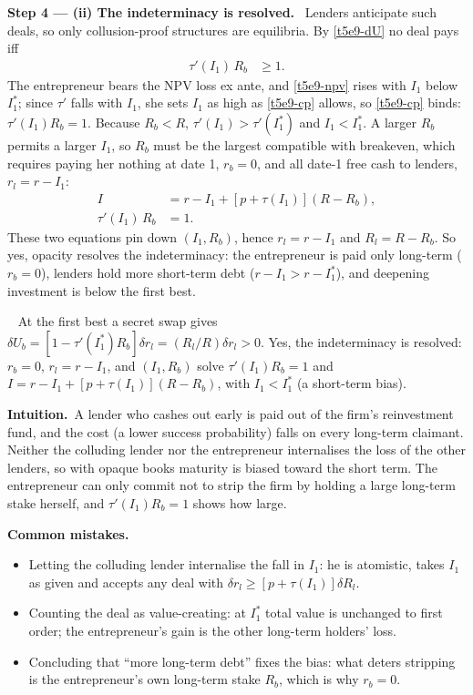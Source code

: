 \documentclass[11pt,a4paper]{article}
\newcommand{\step}[2]{\par\medskip\noindent\textbf{Step #1 --- #2.}~}
\newcommand{\intuition}{\par\medskip\noindent\textbf{Intuition.}~}
\newcommand{\answer}[1]{\par\smallskip\noindent\fbox{\textbf{Answer #1.}}~}
\newcommand{\pitfalls}{\par\medskip\noindent\textbf{Common mistakes.}}
\begin{document}
\step{4}{(ii) The indeterminacy is resolved} Lenders anticipate such deals, so only collusion-proof structures are
equilibria. By \eqref{t5e9-dU} no deal pays iff
\begin{align}
  \tau'(I_1)\,R_b &\ge 1. \label{t5e9-cp}
\end{align}
The entrepreneur bears the NPV loss ex ante, and \eqref{t5e9-npv} rises with $I_1$ below $I_1^*$; since $\tau'$ falls with $I_1$,
she sets $I_1$ as high as \eqref{t5e9-cp} allows, so \eqref{t5e9-cp} binds: $\tau'(I_1)R_b=1$. Because $R_b<R$,
$\tau'(I_1)>\tau'(I_1^*)$ and $I_1<I_1^*$. A larger $R_b$ permits a larger $I_1$, so $R_b$ must be the largest compatible with
breakeven, which requires paying her nothing at date 1, $r_b=0$, and all date-1 free cash to lenders, $r_l=r-I_1$:
\begin{align}
  I &= r-I_1+[p+\tau(I_1)](R-R_b), \label{t5e9-be}\\
  \tau'(I_1)\,R_b &= 1. \label{t5e9-cpb}
\end{align}
These two equations pin down $(I_1,R_b)$, hence $r_l=r-I_1$ and $R_l=R-R_b$. So yes, opacity resolves the
indeterminacy: the entrepreneur is paid only long-term ($r_b=0$), lenders hold more short-term debt
($r-I_1>r-I_1^*$), and deepening investment is below the first best.

\answer{(ii)} At the first best a secret swap gives $\delta U_b=[1-\tau'(I_1^*)R_b]\delta r_l=(R_l/R)\delta r_l>0$.
Yes, the indeterminacy is resolved: $r_b=0$, $r_l=r-I_1$, and $(I_1,R_b)$ solve $\tau'(I_1)R_b=1$ and
$I=r-I_1+[p+\tau(I_1)](R-R_b)$, with $I_1<I_1^*$ (a short-term bias).

\intuition A lender who cashes out early is paid out of the firm's reinvestment fund, and the cost (a lower success
probability) falls on every long-term claimant. Neither the colluding lender nor the entrepreneur internalises the
loss of the other lenders, so with opaque books maturity is biased toward the short term. The entrepreneur can only
commit not to strip the firm by holding a large long-term stake herself, and $\tau'(I_1)R_b=1$ shows how large.

\pitfalls
\begin{itemize}
  \item Letting the colluding lender internalise the fall in $I_1$: he is atomistic, takes $I_1$ as given
        and accepts any deal with $\delta r_l\ge[p+\tau(I_1)]\delta R_l$.
  \item Counting the deal as value-creating: at $I_1^*$ total value is unchanged to first order; the
        entrepreneur's gain is the other long-term holders' loss.
  \item Concluding that ``more long-term debt'' fixes the bias: what deters stripping is the
        entrepreneur's own long-term stake $R_b$, which is why $r_b=0$.
\end{itemize}
\end{document}
